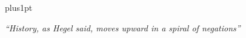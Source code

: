 \documentclass[twoside,11pt]{Latex/Classes/PhDthesisPSnPDF}
\begin{document}
\newpage


       
\hfuzz=50pt






\renewcommand\baselinestretch{1.2}
\baselineskip=18pt plus1pt



\begin{center}
\textit{``History, as Hegel said, moves upward in a spiral of negations'' }
\end{center}


\newpage
%
%
%
%








%   
\end{document}
